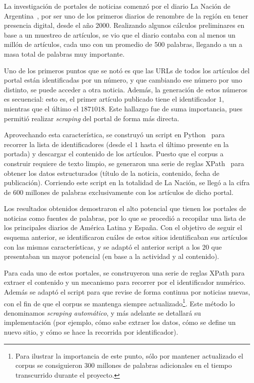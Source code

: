 La investigación de portales de noticias comenzó por el diario La Nación de
Argentina~\cite{LaNacion}, por ser uno de los primeros diarios de renombre de la región en tener presencia
digital, desde el año 2000. Realizando algunos cálculos preliminares en base a un muestreo de artículos, se
vio que el diario contaba con al menos un millón de artículos, cada uno con un promedio de 500
palabras, llegando a un a masa total de palabras muy importante.

Uno de los primeros puntos que se notó es que las URLs de todos los artículos del portal están
identificadas por un número, y que cambiando ese número por uno distinto, se puede acceder a otra
noticia. Además, la generación de estos números es secuencial: esto es, el primer artículo publicado
tiene el identificador $1$, mientras que el último el $1871018$. Este hallazgo fue de suma
importancia, pues permitió realizar \textit{scraping} del portal de forma más directa.

Aprovechando esta característica, se construyó un script en Python~\cite{Python} para recorrer la
lista de identificadores (desde el $1$ hasta el último presente en la portada) y descargar el
contenido de los artículos. Puesto que el corpus a construir requiere de texto limpio, se generaron
una serie de reglas XPath~\cite{XPath} para obtener los datos estructurados (título de la noticia,
contenido, fecha de publicación). Corriendo este script en la totalidad de La Nación, se llegó a la
cifra de 600 millones de palabras exclusivamente con los artículos de dicho portal.

Los resultados obtenidos demostraron el alto potencial que tienen los portales de noticias como
fuentes de palabras, por lo que se procedió a recopilar una lista de los principales diarios de
América Latina y España. Con el objetivo de seguir el esquema anterior, se identificaron cuáles de
estos sitios identificaban sus artículos con las mismas características, y se adaptó el anterior
script a los 20 que presentaban un mayor potencial (en base a la actividad y al contenido).

Para cada uno de estos portales, se construyeron una serie de reglas XPath para extraer el contenido
y un mecanismo para recorrer por el identificador numérico. Además se adaptó el script para que
revise de forma continua por noticias nuevas, con el fin de que el corpus se mantenga siempre
actualizado\footnote{Para ilustrar la importancia de este punto, sólo por mantener actualizado el
corpus se consiguieron 300 millones de palabras adicionales en el tiempo transcurrido durante el proyecto.}.
Este método lo denominamos \textit{scraping automático}, y más adelante se detallará su implementación
(por ejemplo, cómo sabe extraer los datos, cómo se define un nuevo sitio, y cómo se hace la recorrida por
identificador).

